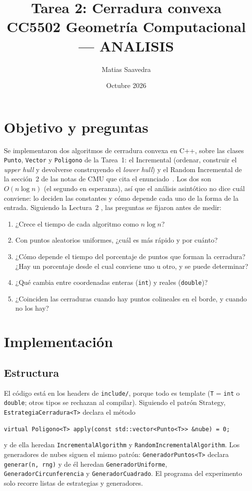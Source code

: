 \documentclass[11pt,letterpaper]{article}
\title{Tarea 2: Cerradura convexa\\[2pt]
  \large CC5502 Geometría Computacional --- ANALISIS}
\author{Matias Saavedra}
\date{Octubre 2026}
\newcommand{\inc}{\textsf{Incremental}}
\newcommand{\ran}{\textsf{Random Incremental}}
\newcommand{\code}[1]{\texttt{#1}}
\begin{document}
\maketitle

\section{Objetivo y preguntas}

Se implementaron dos algoritmos de cerradura convexa en C++, sobre las clases
\code{Punto}, \code{Vector} y \code{Poligono} de la Tarea~1: el \inc{} (ordenar,
construir el \emph{upper hull} y devolverse construyendo el \emph{lower hull}) y
el \ran{} de la sección~2 de las notas de CMU que cita el
enunciado~\cite{cmu}. Los dos son $O(n\log n)$ (el segundo en esperanza), así
que el análisis asintótico no dice cuál conviene: lo deciden las constantes y
cómo depende cada uno de la forma de la entrada. Siguiendo la Lectura~2
\cite{moret}, las preguntas se fijaron antes de medir:

\begin{enumerate}[label=\textbf{P\arabic*}]
  \item ¿Crece el tiempo de cada algoritmo como $n\log n$?
  \item Con puntos aleatorios uniformes, ¿cuál es más rápido y por cuánto?
  \item ¿Cómo depende el tiempo del porcentaje de puntos que forman la
        cerradura? ¿Hay un porcentaje desde el cual conviene uno u otro, y se
        puede determinar?
  \item ¿Qué cambia entre coordenadas enteras (\code{int}) y reales
        (\code{double})?
  \item ¿Coinciden las cerraduras cuando hay puntos colineales en el borde, y
        cuando no los hay?
\end{enumerate}


\section{Implementación}

\subsection{Estructura}

El código está en los headers de \code{include/}, porque todo es template
(\code{T} = \code{int} o \code{double}; otros tipos se rechazan al compilar).
Siguiendo el patrón Strategy,
\code{EstrategiaCerradura<T>} declara el método
\begin{center}
\code{virtual Poligono<T> apply(const std::vector<Punto<T>> \&nube) = 0;}
\end{center}
y de ella heredan \code{IncrementalAlgorithm} y \code{RandomIncrementalAlgorithm}. Los generadores de nubes siguen el mismo
patrón: \code{GeneradorPuntos<T>} declara \code{generar(n, rng)} y de él
heredan \code{GeneradorUniforme}, \code{GeneradorCircunferencia} y
\code{GeneradorCuadrado}. El programa del experimento solo recorre listas de
estrategias y generadores.
\end{document}
